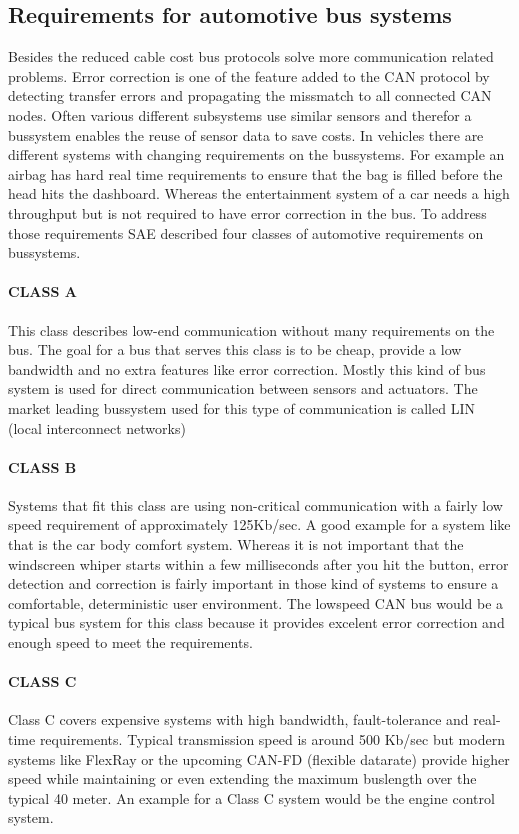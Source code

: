 	\subsection{Requirements for automotive bus systems}
	Besides the reduced cable cost bus protocols solve more communication related
	problems. Error correction is one of the feature added to the CAN protocol by
	detecting transfer errors and propagating the missmatch to all connected CAN
	nodes. Often various different subsystems use similar sensors and therefor a
	bussystem enables the reuse of sensor data to save costs. In vehicles there are
	different systems with changing requirements on the bussystems. For example an
	airbag has hard real time requirements to ensure that the bag is filled before
	the head hits the dashboard. Whereas the entertainment system of a car needs a
	high throughput but is not required to have error correction in the bus. To address
	those requirements SAE described four classes of automotive requirements on
	bussystems.\cite{sae-classes} 
	
	\paragraph{CLASS A}
	This class describes low-end communication without many requirements on the
	bus. The goal for a bus that serves this class is to be cheap, provide a low
	bandwidth and no extra features like error correction. Mostly this kind of
	bus system is used for direct communication between sensors and actuators. The
	market leading bussystem used for this type of communication is called LIN
	(local interconnect networks)
	\paragraph{CLASS B}
	Systems that fit this class are using non-critical communication with a fairly
	low speed requirement of approximately 125Kb/sec. A good example for a system
	like that is the car body comfort system. Whereas it is not important that the
	windscreen whiper starts within a few milliseconds after you hit the button,
	error detection and correction is fairly important in those kind of systems to
	ensure a comfortable, deterministic user environment. The lowspeed CAN bus
	would be a typical bus system for this class because it provides excelent error
	correction and enough speed to meet the requirements.
	\paragraph{CLASS C}
	Class C covers expensive systems with high bandwidth, fault-tolerance and
	real-time requirements. Typical transmission speed is around 500 Kb/sec but
	modern systems like FlexRay or the upcoming CAN-FD (flexible
	datarate)\cite{canfd-conference} provide higher speed while maintaining or even
	extending the maximum buslength over the typical 40 meter. An example for a
	Class C system would be the engine control system.
	
